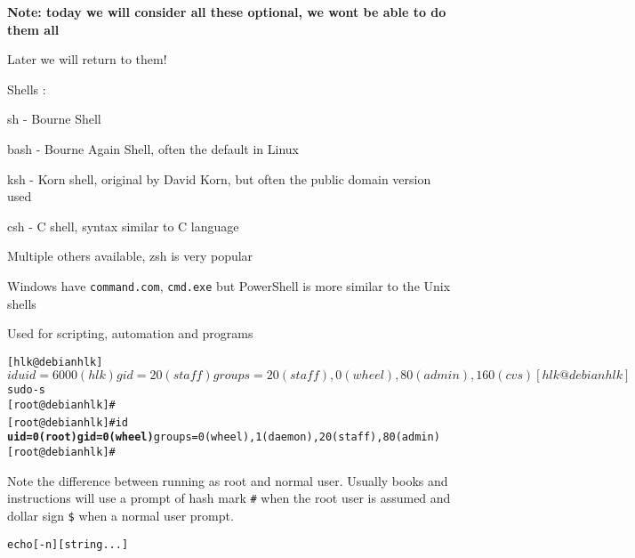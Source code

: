 \documentclass[Screen16to9,17pt]{foils}
\begin{document}
{\bf Note: today we will consider all these optional, we wont be able to do them all}

Later we will return to them!


\begin{list1}
\item Shells :
  \begin{list2}
    \item sh - Bourne Shell
\item bash - Bourne Again Shell, often the default in Linux
\item ksh - Korn shell, original by David Korn, but often the public domain version used
\item csh - C shell, syntax similar to C language
\item Multiple others available, zsh is very popular
  \end{list2}
\item Windows have \verb+command.com+, \verb+cmd.exe+ but PowerShell is more similar to the Unix shells
\item Used for scripting, automation and programs
\end{list1}




\begin{alltt}
[hlk@debian hlk]$ id
uid=6000(hlk) gid=20(staff) groups=20(staff), 0(wheel), 80(admin), 160(cvs)
[hlk@debian hlk]$ sudo -s
[root@debian hlk]#
[root@debian hlk]# id {\bf
uid=0(root) gid=0(wheel)} groups=0(wheel), 1(daemon), 20(staff), 80(admin)
[root@debian hlk]#
\end{alltt}

Note the difference between running as root and normal user. Usually books and instructions will use a prompt of hash mark \verb+#+ when the root user is assumed and dollar sign \verb+$+ when a normal user prompt.


\begin{alltt}
echo [-n] [string ...]
\end{alltt}
\end{document}
